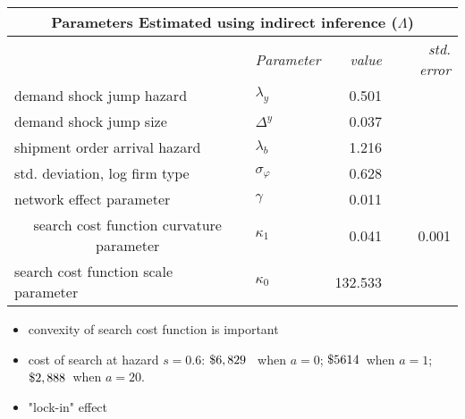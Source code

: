 \documentclass[notes=show]{beamer}
\begin{document}
\begin{frame}%


\begin{center}
{\small 
\begin{tabular}{llrr}
\multicolumn{4}{c}{\textbf{Parameters Estimated using indirect inference (}$%
\Lambda $\textbf{)}} \\ \hline\hline
& \textit{Parameter} & \textit{value} & \textit{std. error} \\ \cline{2-4}
demand shock jump hazard                                     & $\lambda _{y}$       & 0.501    &       \\
demand shock jump size                                       & $\Delta ^{y}$        & 0.037    &       \\
shipment order arrival hazard                                & $\lambda _{b}$       & 1.216    &       \\
std. deviation, log firm type                                & $\sigma _{\varphi }$ & 0.628    &       \\
network effect parameter                                     & $\gamma $            & 0.011    &       \\
\multicolumn{1}{c}{search cost function curvature parameter} & $\kappa _{1}$
                                                             & 0.041                & 0.001            \\
search cost function scale parameter                         & $\kappa _{0}$        & 132.533  &       \\
\hline
\end{tabular}%
}
\end{center}

\begin{itemize}
\item {\small convexity of search cost function is important}

\item {\small cost of search at hazard }$s=0.6${\small : }${\small \$6,829}$%
{\small \ when }$a=0${\small ; }${\small \$5614}${\small \ when }$a=1${\small ; }${\small \$2,888}${\small \ when } $a=20.$

\item {\small "lock-in" effect}
\end{itemize}

\end{frame}%
\end{document}
